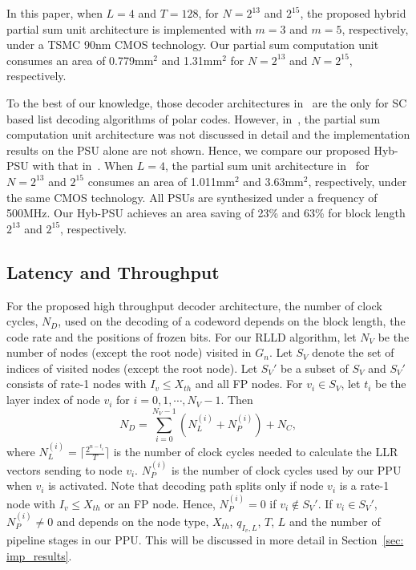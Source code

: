\documentclass[journal]{IEEEtran}
\begin{document}
In this paper, when $L=4$ and $T=128$, for $N=2^{13}$ and $2^{15}$, the proposed hybrid partial sum unit architecture is implemented with $m=3$ and $m=5$, respectively, under a TSMC 90nm CMOS technology. Our partial sum computation unit consumes an area of 0.779mm$^{2}$ and 1.31mm$^2$ for $N=2^{13}$ and $N=2^{15}$, respectively.

To the best of our knowledge, those decoder architectures in~\cite{tree_list_dec, jun_low_mem_list, chuan_list, yuan_low_latency} are the only for SC based list decoding algorithms of polar codes. However, in~\cite{tree_list_dec,chuan_list, yuan_low_latency}, the partial sum computation unit architecture was not discussed in detail and the implementation results on the PSU alone are not shown. Hence, we compare our proposed Hyb-PSU with that in~\cite{jun_low_mem_list}.
When $L=4$, the partial sum unit architecture in~\cite{jun_low_mem_list} for $N=2^{13}$ and $2^{15}$  consumes an area of 1.011mm$^{2}$ and 3.63mm$^2$, respectively, under the same CMOS technology. All PSUs are synthesized under a frequency of 500MHz. Our Hyb-PSU achieves an area saving of 23\% and 63\% for block length $2^{13}$ and $2^{15}$, respectively.



\subsection{Latency and Throughput} \label{ssec: dec_cycle}

For the proposed high throughput decoder architecture, the number of clock cycles, $N_D$, used on the decoding of a codeword depends on the block length,  the code rate and the positions of frozen bits.
For our RLLD algorithm, let $N_V$ be the number of nodes (except the root node) visited in $G_n$. Let $S_V$ denote the set of indices of visited nodes (except the root node). Let $S_V'$ be a subset of $S_V$ and $S_V'$ consists of rate-1 nodes with $I_v \leqslant X_{th}$ and all FP nodes. For $v_i \in S_V$, let $t_i$ be the layer index of node $v_i$ for $i=0,1,\cdots,N_V-1$.
Then
\begin{equation}\label{equ: cycle_cnt}
N_D = \sum_{i=0}^{N_V-1}(N_L^{(i)}+N_P^{(i)})+N_C,
\end{equation}
where $N_L^{(i)} = \lceil\frac{2^{n-t_i}}{T}\rceil$ is the number of clock cycles needed to calculate the LLR vectors sending to node $v_i$. $N_P^{(i)}$ is the number of clock cycles used by our PPU when $v_i$ is activated. Note that decoding path splits only if node $v_i$ is a rate-1 node with $I_v\leqslant X_{th}$ or an FP node. Hence, $N_P^{(i)} = 0$ if $v_i \not\in S_V'$. If $v_i\in S_V'$, $N_P^{(i)}\neq 0$ and depends on the node type, $X_{th}$, $q_{I_v,L}$, $T$, $L$ and the number of pipeline stages in our PPU. This will be discussed in more detail in Section~\ref{sec: imp_results}.
\end{document}
